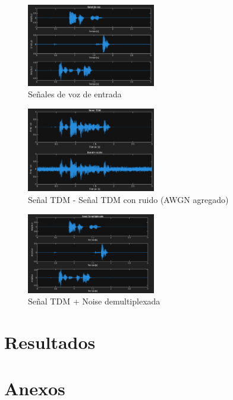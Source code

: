 \documentclass[conference]{IEEEtran}
\begin{document}
	\begin{figure}[h]
		\centering
		\includegraphics[width=0.5\textwidth]{media/input-signals-voice}
		\caption{Señales de voz de entrada}
		\label{fig:input-signals-voice}
	\end{figure}
	
	\begin{figure}[h]
		\centering
		\includegraphics[width=0.5\textwidth]{media/tmd-signal-and-noise}
		\caption{Señal TDM - Señal TDM con ruido (AWGN agregado)}
		\label{fig:tmd-signal-and-noise}
	\end{figure}
	
	\begin{figure}[h]
		\centering
		\includegraphics[width=0.5\textwidth]{media/demux-tdm-signal-noise}
		\caption{Señal TDM + Noise demultiplexada}
		\label{fig:demux-tdm-signal-noise}
	\end{figure}
	
	
	\section{Resultados}
	
	
	
	
	\section{Anexos}
\end{document}
